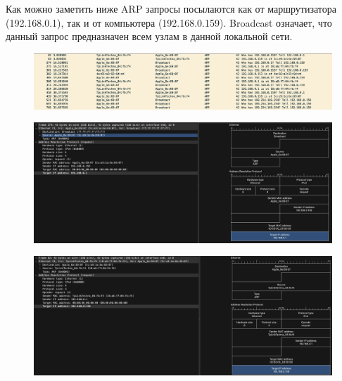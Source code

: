 \documentclass[12pt,onecolumn]{article}
\begin{document}
Как можно заметить ниже ARP запросы посылаются как от маршрутизатора
(192.168.0.1), так и от компьютера (192.168.0.159). Broadcast означает, что
данный запрос предназначен всем узлам в данной локальной сети.
\begin{figure}[H]
    \centering
    \includegraphics*[width=\textwidth]{image/part5/arp-req.png}
\end{figure}
\begin{figure}[H]
    \centering
    \includegraphics*[width=\textwidth]{image/part5/arp.png}
\end{figure}
\begin{figure}[H]
    \centering
    \includegraphics*[width=\textwidth]{image/part5/arp-2.png}
\end{figure}
\end{document}
